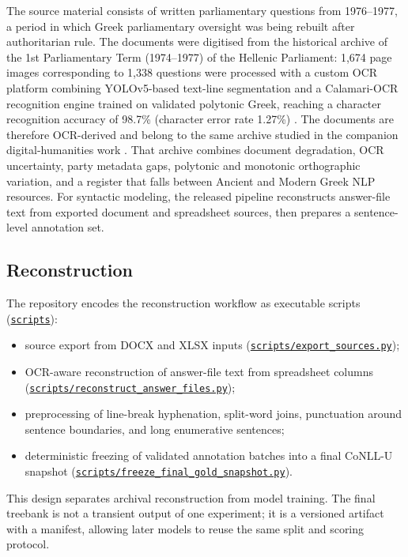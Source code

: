 \documentclass[11pt]{article}
\newcommand{\repobase}{https://github.com/gmikros/katharevousa-nlp-tooling}
\newcommand{\repofile}[1]{\href{\repobase/blob/main/#1}{\nolinkurl{#1}}}
\newcommand{\repodir}[1]{\href{\repobase/tree/main/#1}{\nolinkurl{#1}}}
\begin{document}
The source material consists of written parliamentary questions from 1976--1977, a period in which Greek parliamentary oversight was being rebuilt after authoritarian rule. The documents were digitised from the historical archive of the 1st Parliamentary Term (1974--1977) of the Hellenic Parliament: 1{,}674 page images corresponding to 1{,}338 questions were processed with a custom OCR platform combining YOLOv5-based text-line segmentation and a Calamari-OCR recognition engine trained on validated polytonic Greek, reaching a character recognition accuracy of 98.7\% (character error rate 1.27\%) \cite{fitsilis2024digitization}. The documents are therefore OCR-derived and belong to the same archive studied in the companion digital-humanities work \cite{mikrosfitsilis2025dsh}. That archive combines document degradation, OCR uncertainty, party metadata gaps, polytonic and monotonic orthographic variation, and a register that falls between Ancient and Modern Greek NLP resources. For syntactic modeling, the released pipeline reconstructs answer-file text from exported document and spreadsheet sources, then prepares a sentence-level annotation set.

\subsection{Reconstruction}

The repository encodes the reconstruction workflow as executable scripts (\repodir{scripts}):

\begin{itemize}[leftmargin=1.5em]
  \item source export from DOCX and XLSX inputs (\repofile{scripts/export_sources.py});
  \item OCR-aware reconstruction of answer-file text from spreadsheet columns (\repofile{scripts/reconstruct_answer_files.py});
  \item preprocessing of line-break hyphenation, split-word joins, punctuation around sentence boundaries, and long enumerative sentences;
  \item deterministic freezing of validated annotation batches into a final CoNLL-U snapshot (\repofile{scripts/freeze_final_gold_snapshot.py}).
\end{itemize}

This design separates archival reconstruction from model training. The final treebank is not a transient output of one experiment; it is a versioned artifact with a manifest, allowing later models to reuse the same split and scoring protocol.
\end{document}
